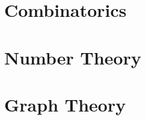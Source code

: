 \documentclass[10pt,a4paper,oneside]{book}
\begin{document}
\tableofcontents

\chapter{Combinatorics} %


\chapter{Number Theory}


\chapter{Graph Theory}

\end{document}
